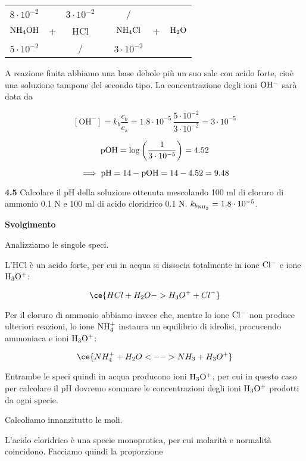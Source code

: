 \begin{center}
    \begin{tabular}{ccccccc}
        $8 \cdot 10^{-2}$ &  & $3 \cdot 10^{-2}$ & & / &&\\
        $\rm NH_4OH$ & + & HCl & \ce{->} & $\rm NH_4Cl$ & + & $\rm H_2O$\\
        $5 \cdot 10^{-2}$ &  &  / & & $3 \cdot 10^{-2}$&&\\
    \end{tabular}
\end{center}

A reazione finita abbiamo una base debole più un suo sale con acido forte, cioè una soluzione tampone del secondo tipo. La concentrazione degli ioni $\rm OH^-$ sarà data da

$$[\text{OH}^-]=k_b\frac{c_b}{c_s}
=1.8 \cdot 10^{-5}\,\frac{5 \cdot 10^{-2}}{3 \cdot 10^{-2}}= 3 \cdot 10^{-5}$$

$$\rm pOH=\log\left(\frac{1}{3 \cdot 10^{-5}}\right)=4.52$$

$$\implies \rm pH=14-pOH=14-4.52=9.48$$



\vspace{0.2cm}\textbf{4.5} Calcolare il pH della soluzione ottenuta mescolando 100 ml di cloruro di ammonio 0.1 N e 100
ml di acido cloridrico 0.1 N. $k_{b_{\rm NH_3}}=1.8 \cdot 10^{-5}$.

\vspace{0.2cm}\large\textbf{Svolgimento}\normalsize

\vspace{0.2cm}Analizziamo le singole speci.

L'HCl è un acido forte, per cui in acqua si dissocia totalmente in ione $\rm Cl^-$ e ione $\rm H_3O^+$:

$$\ce{HCl + H_2O -> H_3O^+ + Cl^-}$$

Per il cloruro di ammonio abbiamo invece che, mentre lo ione $\rm Cl^-$ non produce ulteriori reazioni, lo ione $\rm NH_4^+$ instaura un equilibrio di idrolisi, procucendo ammoniaca e ioni $\rm H_3O^+$:

$$\ce{NH_4^+ + H_2O <--> NH_3 + H_3O^+}$$

Entrambe le speci quindi in acqua producono ioni $\rm H_3O^+$, per cui in questo caso per calcolare il pH dovremo sommare le concentrazioni degli ioni $\rm H_3O^+$ prodotti da ogni specie.

Calcoliamo innanzitutto le moli.

L'acido cloridrico è una specie monoprotica, per cui molarità e normalità coincidono. Facciamo quindi la proporzione

